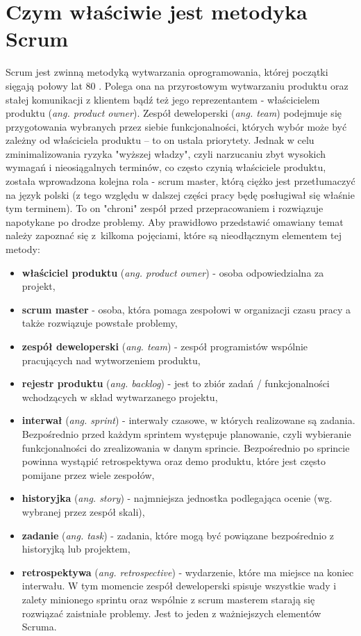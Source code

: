 \section{Czym właściwie jest metodyka Scrum}
Scrum jest zwinną metodyką wytwarzania oprogramowania, której początki sięgają połowy lat 80 \cite{SCRUM}. Polega ona na przyrostowym wytwarzaniu produktu oraz stałej komunikacji z klientem bądź też jego reprezentantem - właścicielem produktu (\textit{ang. product owner}). Zespół deweloperski ({\textit{ang. team}}) podejmuje się przygotowania wybranych przez siebie funkcjonalności, których wybór może być zależny od właściciela produktu -- to on ustala priorytety. Jednak w celu zminimalizowania ryzyka "wyższej władzy", czyli narzucaniu zbyt wysokich wymagań i nieosiągalnych terminów, co często czynią właściciele produktu, została wprowadzona kolejna rola - scrum master, którą ciężko jest przetłumaczyć na język polski (z tego względu w dalszej części pracy będę posługiwał się właśnie tym terminem). To on "chroni" zespół przed przepracowaniem i rozwiązuje napotykane po drodze problemy. Aby prawidłowo przedstawić omawiany temat należy zapoznać się z~kilkoma pojęciami, które są nieodłącznym elementem tej metody:
\begin{itemize}
	\item \textbf{właściciel produktu} (\textit{ang. product owner}) - osoba odpowiedzialna za projekt,
	\item \textbf{scrum master} - osoba, która pomaga zespołowi w organizacji czasu pracy a także rozwiązuje powstałe problemy,
	\item \textbf{zespół deweloperski} (\textit{ang. team}) - zespół programistów wspólnie pracujących nad wytworzeniem produktu,
	\item \textbf{rejestr produktu} (\textit{ang. backlog}) - jest to zbiór zadań / funkcjonalności wchodzących w skład wytwarzanego projektu,
	\item \textbf{interwał} (\textit{ang. sprint}) - interwały czasowe, w których realizowane są zadania. Bezpośrednio przed każdym sprintem występuje planowanie, czyli wybieranie funkcjonalności do zrealizowania w danym sprincie. Bezpośrednio po sprincie powinna wystąpić retrospektywa oraz demo produktu, które jest często pomijane przez wiele zespołów,
	\item \textbf{historyjka} (\textit{ang. story}) - najmniejsza jednostka podlegająca ocenie (wg. wybranej przez zespół skali),
	\item \textbf{zadanie} (\textit{ang. task}) - zadania, które mogą być powiązane bezpośrednio z historyjką lub projektem,
	\item \textbf{retrospektywa} (\textit{ang. retrospective}) - wydarzenie, które ma miejsce na koniec interwału. W tym momencie zespół deweloperski spisuje wszystkie wady i zalety minionego sprintu oraz wspólnie z scrum masterem starają się rozwiązać zaistniałe problemy. Jest to jeden z ważniejszych elementów Scruma.
\end{itemize} 

